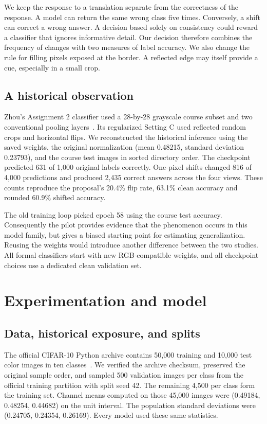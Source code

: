 \documentclass[conference]{IEEEtran}
\begin{document}
We keep the response to a translation separate from the correctness of the response. A model can return the same wrong class five times. Conversely, a shift can correct a wrong answer. A decision based solely on consistency could reward a classifier that ignores informative detail. Our decision therefore combines the frequency of changes with two measures of label accuracy. We also change the rule for filling pixels exposed at the border. A reflected edge may itself provide a cue, especially in a small crop.

\subsection{A historical observation}
Zhou's Assignment 2 classifier used a 28-by-28 grayscale course subset and two conventional pooling layers~\cite{zhou}. Its regularized Setting C used reflected random crops and horizontal flips. We reconstructed the historical inference using the saved weights, the original normalization (mean 0.48215, standard deviation 0.23793), and the course test images in sorted directory order. The checkpoint predicted 631 of 1,000 original labels correctly. One-pixel shifts changed 816 of 4,000 predictions and produced 2,435 correct answers across the four views. These counts reproduce the proposal's 20.4\% flip rate, 63.1\% clean accuracy and rounded 60.9\% shifted accuracy.

The old training loop picked epoch 58 using the course test accuracy. Consequently the pilot provides evidence that the phenomenon occurs in this model family, but gives a biased starting point for estimating generalization. Reusing the weights would introduce another difference between the two studies. All formal classifiers start with new RGB-compatible weights, and all checkpoint choices use a dedicated clean validation set.

\section{Experimentation and model}
\subsection{Data, historical exposure, and splits}
The official CIFAR-10 Python archive contains 50,000 training and 10,000 test color images in ten classes~\cite{cifar,cifartech}. We verified the archive checksum, preserved the original sample order, and sampled 500 validation images per class from the official training partition with split seed 42. The remaining 4,500 per class form the training set. Channel means computed on those 45,000 images were (0.49184, 0.48254, 0.44682) on the unit interval. The population standard deviations were (0.24705, 0.24354, 0.26169). Every model used these same statistics.
\end{document}
